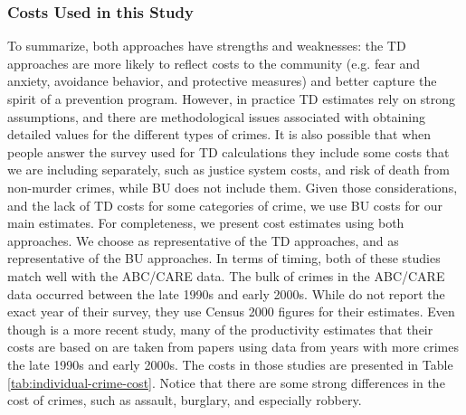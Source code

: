 \subsubsection{Costs Used in this Study}
\noindent To summarize, both approaches have strengths and weaknesses: the TD approaches are more likely to reflect costs to the community (e.g. fear and anxiety, avoidance behavior, and protective measures) and better capture the spirit of a prevention program. However, in practice TD estimates rely on strong assumptions, and there are methodological issues associated with obtaining detailed values for the different types of crimes. It is also possible that when people answer the survey used for TD calculations they include some costs that we are including separately, such as justice system costs, and risk of death from non-murder crimes, while BU does not include them. Given those considerations, and the lack of TD costs for some categories of crime, we use BU costs for our main estimates. For completeness, we present cost estimates using both approaches. We choose \cite{Cohen_Rust_etal_2004_Criminology} as representative of the TD approaches, and \cite{McCollister_etal_2010_DAD} as representative of the BU approaches. In terms of timing, both of these studies match well with the ABC/CARE data. The bulk of crimes in the ABC/CARE data occurred between the late 1990s and early 2000s. While \cite{Cohen_Rust_etal_2004_Criminology} do not report the exact year of their survey, they use Census 2000 figures for their estimates. Even though \cite{McCollister_etal_2010_DAD} is a more recent study, many of the productivity estimates that their costs are based on are taken from papers using data from years with more crimes the late 1990s and early 2000s. The costs in those studies are presented in Table \ref{tab:individual-crime-cost}. Notice that there are some strong differences in the cost of crimes, such as assault, burglary, and especially robbery. \\



